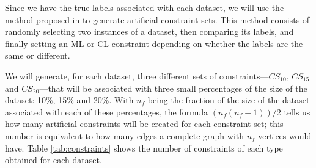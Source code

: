 Since we have the true labels associated with each dataset, we will use the method proposed in \cite{wagstaff2001constrained} to generate artificial constraint sets. This method consists of randomly selecting two instances of a dataset, then comparing its labels, and finally setting an ML or CL constraint depending on whether the labels are the same or different.

We will generate, for each dataset, three different sets of constraints---$CS_{10}$, $CS_{15}$ and $CS_{20}$---that will be associated with three small percentages of the size of the dataset: 10\%, 15\% and 20\%. With $n_f$ being the fraction of the size of the dataset associated with each of these percentages, the formula $(n_f(n_f-1))/2$ tells us how many artificial constraints will be created for each constraint set; this number is equivalent to how many edges a complete graph with $n_f$ vertices would have. Table \ref{tab:constraints} shows the number of constraints of each type obtained for each dataset.

